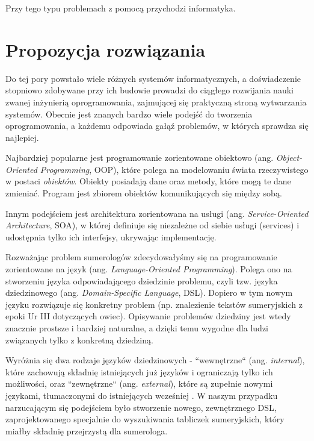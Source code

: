 Przy tego typu problemach z pomocą przychodzi informatyka. 

\section*{Propozycja rozwiązania}
Do tej pory powstało wiele różnych systemów informatycznych, a doświadczenie stopniowo zdobywane przy ich budowie prowadzi do 
ciągłego rozwijania nauki zwanej inżynierią oprogramowania, zajmującej się praktyczną stroną wytwarzania systemów. Obecnie jest 
znanych bardzo wiele podejść do tworzenia oprogramowania, a każdemu odpowiada gałąź problemów, w których sprawdza się najlepiej. 

Najbardziej popularne jest programowanie zorientowane obiektowo (ang. \emph{Object-Oriented Programming}, OOP), które polega na modelowaniu 
świata rzeczywistego w postaci \textit{obiektów}. Obiekty posiadają dane oraz metody, które mogą te dane zmieniać. Program jest zbiorem 
obiektów komunikujących się między sobą. 

Innym podejściem jest architektura zorientowana na usługi (ang. \emph{Service-Oriented Architecture}, SOA), w której definiuje się 
niezależne od siebie usługi (services) i udostępnia tylko ich interfejsy, ukrywając implementację.

Rozważając problem sumerologów zdecydowałyśmy się na programowanie zorientowane na język (ang. \emph{Language-Oriented Programming}). 
Polega ono na stworzeniu języka odpowiadającego dziedzinie problemu, czyli tzw. języka dziedzinowego (ang. \emph{Domain-Specific Language},
 DSL). Dopiero w tym nowym języku rozwiązuje się konkretny problem (np. znalezienie tekstów sumeryjskich z epoki Ur III dotyczących owiec). 
Opisywanie problemów dziedziny jest wtedy znacznie prostsze i bardziej naturalne, a dzięki temu wygodne dla ludzi związanych tylko z 
konkretną dziedziną. 

Wyróżnia się dwa rodzaje języków dziedzinowych - ``wewnętrzne`` (ang. \emph{internal}), które zachowują składnię istniejących już języków 
i ograniczają tylko ich możliwości, oraz ``zewnętrzne`` (ang. \emph{external}), które są zupełnie nowymi językami, tłumaczonymi do 
istniejących wcześniej \cite{fowler}. W naszym przypadku narzucającym się podejściem było stworzenie nowego, zewnętrznego DSL, zaprojektowanego 
specjalnie do wyszukiwania tabliczek sumeryjskich, który miałby składnię przejrzystą dla sumerologa. 


